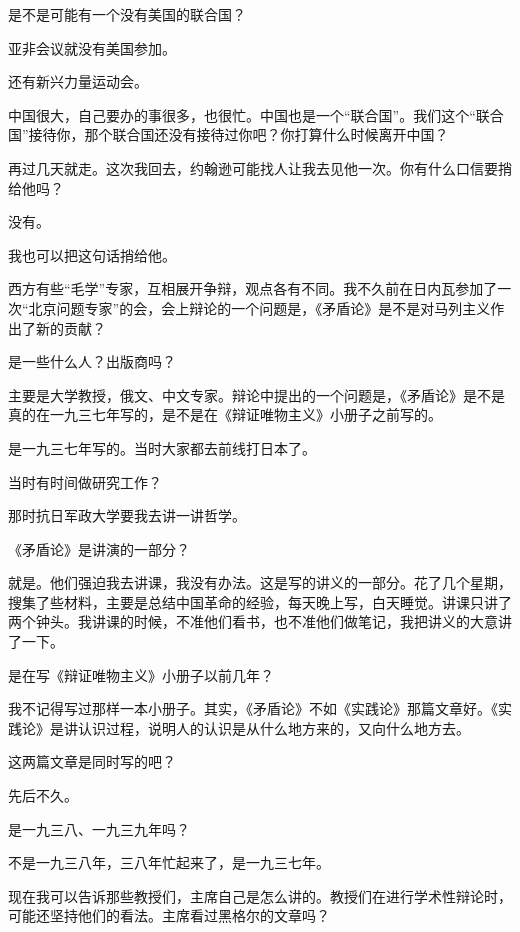 是不是可能有一个没有美国的联合国？

亚非会议就没有美国参加。

还有新兴力量运动会。

中国很大，自己要办的事很多，也很忙。中国也是一个“联合国”。我们这个“联合国”接待你，那个联合国还没有接待过你吧？你打算什么时候离开中国？

再过几天就走。这次我回去，约翰逊可能找人让我去见他一次。你有什么口信要捎给他吗？

没有。

我也可以把这句话捎给他。

西方有些“毛学”专家，互相展开争辩，观点各有不同。我不久前在日内瓦参加了一次“北京问题专家”的会，会上辩论的一个问题是，《矛盾论》是不是对马列主义作出了新的贡献？

是一些什么人？出版商吗？

主要是大学教授，俄文、中文专家。辩论中提出的一个问题是，《矛盾论》是不是真的在一九三七年写的，是不是在《辩证唯物主义》小册子之前写的。

是一九三七年写的。当时大家都去前线打日本了。

当时有时间做研究工作？

那时抗日军政大学要我去讲一讲哲学。

《矛盾论》是讲演的一部分？

就是。他们强迫我去讲课，我没有办法。这是写的讲义的一部分。花了几个星期，搜集了些材料，主要是总结中国革命的经验，每天晚上写，白天睡觉。讲课只讲了两个钟头。我讲课的时候，不准他们看书，也不准他们做笔记，我把讲义的大意讲了一下。

是在写《辩证唯物主义》小册子以前几年？

我不记得写过那样一本小册子。其实，《矛盾论》不如《实践论》那篇文章好。《实践论》是讲认识过程，说明人的认识是从什么地方来的，又向什么地方去。

这两篇文章是同时写的吧？

先后不久。

是一九三八、一九三九年吗？

不是一九三八年，三八年忙起来了，是一九三七年。

现在我可以告诉那些教授们，主席自己是怎么讲的。教授们在进行学术性辩论时，可能还坚持他们的看法。主席看过黑格尔的文章吗？

